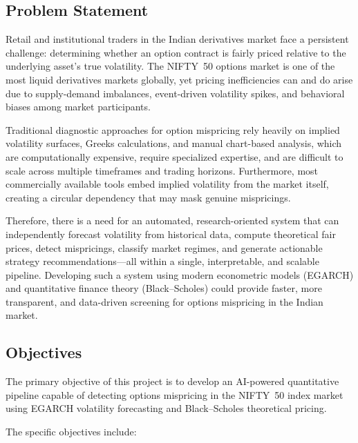 \documentclass[12pt,a4paper]{article}
\begin{document}
\subsection{Problem Statement}

Retail and institutional traders in the Indian derivatives market face a persistent challenge: determining whether an option contract is fairly priced relative to the underlying asset's true volatility. The NIFTY~50 options market is one of the most liquid derivatives markets globally, yet pricing inefficiencies can and do arise due to supply-demand imbalances, event-driven volatility spikes, and behavioral biases among market participants.

Traditional diagnostic approaches for option mispricing rely heavily on implied volatility surfaces, Greeks calculations, and manual chart-based analysis, which are computationally expensive, require specialized expertise, and are difficult to scale across multiple timeframes and trading horizons. Furthermore, most commercially available tools embed implied volatility from the market itself, creating a circular dependency that may mask genuine mispricings.

Therefore, there is a need for an automated, research-oriented system that can independently forecast volatility from historical data, compute theoretical fair prices, detect mispricings, classify market regimes, and generate actionable strategy recommendations---all within a single, interpretable, and scalable pipeline. Developing such a system using modern econometric models (EGARCH) and quantitative finance theory (Black--Scholes) could provide faster, more transparent, and data-driven screening for options mispricing in the Indian market.

\subsection{Objectives}

The primary objective of this project is to develop an AI-powered quantitative pipeline capable of detecting options mispricing in the NIFTY~50 index market using EGARCH volatility forecasting and Black--Scholes theoretical pricing.

The specific objectives include:
\end{document}
